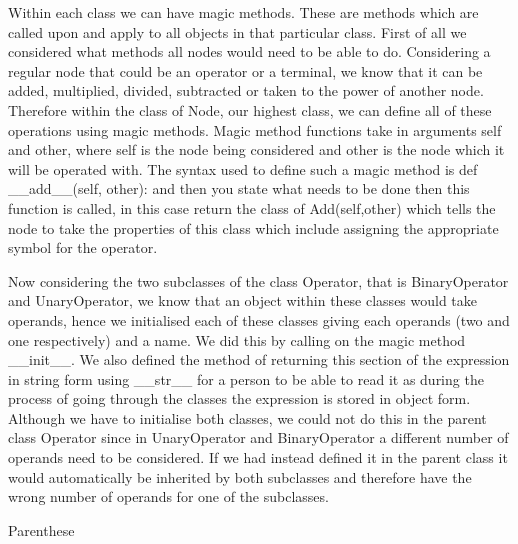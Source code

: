 \documentclass[12pt]{article}
\begin{document}
Within each class we can have magic methods. These are methods which are called upon and apply to all objects in that particular class. First of all we considered what methods all nodes would need to be able to do. Considering a regular node that could be an operator or a terminal, we know that it can be added, multiplied, divided, subtracted or taken to the power of another node. Therefore within the class of Node, our highest class, we can define all of these operations using magic methods. Magic method functions take in arguments self and other, where self is the node being considered and other is the node which it will be operated with. The syntax used to define such a magic method is def \_\_add\_\_(self, other): and then you state what needs to be done then this function is called, in this case return the class of Add(self,other) which tells the node to take the properties of this class which include assigning the appropriate symbol for the operator. 

Now considering the two subclasses of the class Operator, that is BinaryOperator and UnaryOperator, we know that an object within these classes would take operands, hence we initialised each of these classes giving each operands (two and one respectively) and a name. We did this by calling on the magic method \_\_init\_\_. We also defined the method of returning this section of the expression in string form using \_\_str\_\_ for a person to be able to read it as during the process of going through the classes the expression is stored in object form. Although we have to initialise both classes, we could not do this in the parent class Operator since in UnaryOperator and BinaryOperator a different number of operands need to be considered. If we had instead defined it in the parent class it would automatically be inherited by both subclasses and therefore have the wrong number of operands for one of the subclasses. 

Parenthese 
\end{document}
